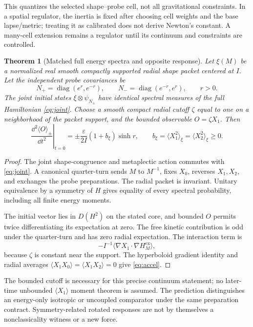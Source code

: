 \documentclass[11pt]{article}
\newtheorem{theorem}{Theorem}[section]\newtheorem{proposition}[theorem]{Proposition}
\begin{document}
This quantizes the selected shape--probe cell, not all gravitational constraints. In a spatial regulator, the inertia is fixed after choosing cell weights and the base lapse/metric; treating it as calibrated does not derive Newton's constant. A many-cell extension remains a regulator until its continuum and constraints are controlled.

\begin{theorem}[Matched full energy spectra and opposite response]\label{thm:response}
Let $\xi(M)$ be a normalized real smooth compactly supported radial shape packet centered at $I$. Let the independent probe covariances be
\[
N_+=\operatorname{diag}(e^r,e^{-r}),\qquad
N_-=\operatorname{diag}(e^{-r},e^r),\qquad r>0.
\]
The joint initial states $\xi\otimes\psi_{N_\pm}$ have identical spectral measures of the full Hamiltonian \eqref{eq:joint}. Choose a smooth compact radial cutoff $\zeta$ equal to one on a neighborhood of the packet support, and the bounded observable $O=\zeta X_1$. Then
\begin{equation}\label{eq:accel}
\left.\frac{\dd^2\langle O\rangle_\pm}{\dd t^2}\right|_{t=0}
=\pm\frac{\varepsilon}{2I}(1+b_\xi)\sinh r,
\qquad b_\xi=\langle X_1^2\rangle_\xi=\langle X_2^2\rangle_\xi\ge0.
\end{equation}
\end{theorem}
\begin{proof}
The joint shape-congruence and metaplectic action commutes with \eqref{eq:joint}. A canonical quarter-turn sends $M$ to $M^{-1}$, fixes $X_0$, reverses $X_1,X_2$, and exchanges the probe preparations. The radial packet is invariant. Unitary equivalence by a symmetry of $H$ gives equality of every spectral probability, including all finite energy moments.

The initial vector lies in $D(H^2)$ on the stated core, and bounded $O$ permits twice differentiating its expectation at zero. The free kinetic contribution is odd under the quarter-turn and has zero radial expectation. The interaction term is
\[
-I^{-1}\langle\nabla X_1\cdot\nabla H_M^{\mathrm{ex}}\rangle,
\]
because $\zeta$ is constant near the support. The hyperboloid gradient identity and radial averages $\langle X_1X_0\rangle=\langle X_1X_2\rangle=0$ give \eqref{eq:accel}.
\end{proof}
The bounded cutoff is necessary for this precise continuum statement; no later-time unbounded $\langle X_1\rangle$ moment theorem is assumed. The prediction distinguishes an energy-only isotropic or uncoupled comparator under the same preparation contract. Symmetry-related rotated responses are not by themselves a nonclassicality witness or a new force.
\end{document}
